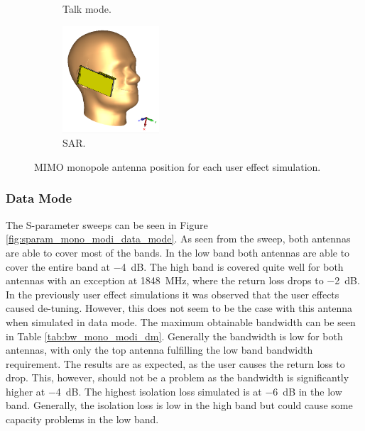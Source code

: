 \begin{figure}[htbp]
\begin{subfigure}[b]{0.24\linewidth}
        \caption{Talk mode.}
    \end{subfigure}
    \begin{subfigure}[b]{0.24\linewidth}
        \centering \includegraphics[width=\linewidth,height=4cm,keepaspectratio]{img/tech_sol/monopole/highband/ue/sar/3d_sar.PNG}
        \caption{SAR.}
    \end{subfigure}
    \caption{MIMO monopole antenna position for each user effect simulation.}
    \label{fig:position_mono_modi}
\end{figure}

\FloatBarrier
\subsubsection{Data Mode}
The S-parameter sweeps can be seen in Figure \ref{fig:sparam_mono_modi_data_mode}. As seen from the sweep, both antennas are able to cover most of the bands. In the low band both antennas are able to cover the entire band at \SI{-4}{dB}. The high band is covered quite well for both antennas with an exception at \SI{1848}{MHz}, where the return loss drops to \SI{-2}{dB}. In the previously user effect simulations   
it was observed that the user effects caused de-tuning. However, this does not seem to be the case with this antenna when simulated in data mode. The maximum obtainable bandwidth can be seen in Table \ref{tab:bw_mono_modi_dm}. Generally the bandwidth is low for both antennas, with only the top antenna fulfilling the low band bandwidth requirement. The results are as expected, as the user causes the return loss to drop. This, however, should not be a problem as the bandwidth is significantly higher at \SI{-4}{dB}.
The highest isolation loss simulated is at \SI{-6}{dB} in the low band. Generally, the isolation loss is low in the high band but could cause some capacity problems in the low band. 

